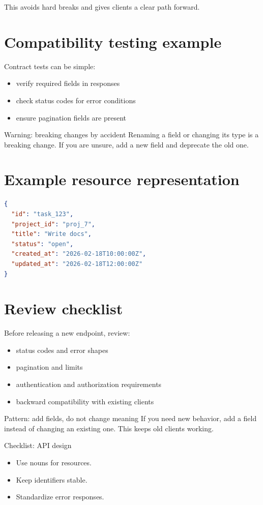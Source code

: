 This avoids hard breaks and gives clients a clear path forward.

\section{Compatibility testing example}
Contract tests can be simple:
\begin{itemize}[nosep]
  \item verify required fields in responses
  \item check status codes for error conditions
  \item ensure pagination fields are present
\end{itemize}

\begin{warningbox}{Warning: breaking changes by accident}
Renaming a field or changing its type is a breaking change.
If you are unsure, add a new field and deprecate the old one.
\end{warningbox}

\section{Example resource representation}
\begin{lstlisting}[language=JSON]
{
  "id": "task_123",
  "project_id": "proj_7",
  "title": "Write docs",
  "status": "open",
  "created_at": "2026-02-18T10:00:00Z",
  "updated_at": "2026-02-18T12:00:00Z"
}
\end{lstlisting}

\section{Review checklist}
Before releasing a new endpoint, review:
\begin{itemize}[nosep]
  \item status codes and error shapes
  \item pagination and limits
  \item authentication and authorization requirements
  \item backward compatibility with existing clients
\end{itemize}
\begin{patternbox}{Pattern: add fields, do not change meaning}
If you need new behavior, add a field instead of changing an existing one.
This keeps old clients working.
\end{patternbox}

\begin{checklistbox}{Checklist: API design}
\begin{itemize}[nosep]
  \item Use nouns for resources.
  \item Keep identifiers stable.
  \item Standardize error responses.
\end{itemize}
\end{checklistbox}
